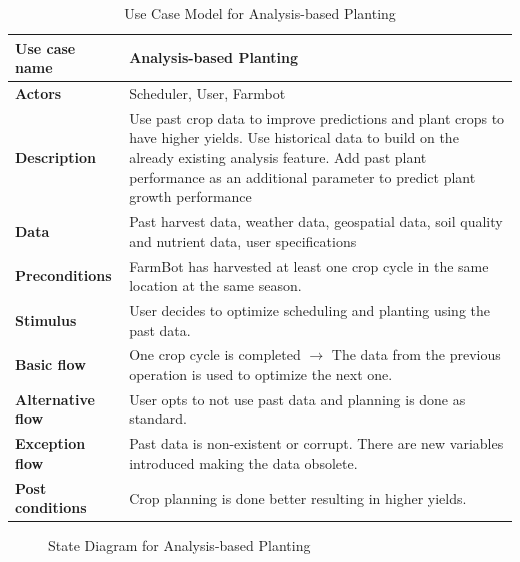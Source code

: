\begin{table}[H]
\centering
\footnotesize
\begin{tabular}{|p{3.5cm}|p{8.5cm}|}
\hline
\textbf{Use case name}    & Analysis-based Planting \\
\hline
\textbf{Actors}           & Scheduler, User, Farmbot \\
\hline
\textbf{Description}      & Use past crop data to improve predictions and plant crops to have higher yields. Use historical data to build on the already existing analysis feature. Add past plant performance as an additional parameter to predict plant growth performance\\
\hline
\textbf{Data}             & Past harvest data, weather data, geospatial data, soil quality and nutrient data, user specifications \\
\hline
\textbf{Preconditions}    & FarmBot has harvested at least one crop cycle in the same location at the same season. \\
\hline
\textbf{Stimulus}         & User decides to optimize scheduling and planting using the past data. \\
\hline
\textbf{Basic flow}       & One crop cycle is completed $\rightarrow$ The data from the previous operation is used to optimize the next one. \\
\hline
\textbf{Alternative flow} & User opts to not use past data and planning is done as standard. \\
\hline
\textbf{Exception flow}   & Past data is non-existent or corrupt. There are new variables introduced making the data obsolete. \\
\hline
\textbf{Post conditions}  & Crop planning is done better resulting in higher yields. \\
\hline
\end{tabular}
\caption{Use Case Model for Analysis-based Planting}
\end{table}

\begin{figure}[H]
    \centering

\caption{State Diagram for Analysis-based Planting}
\end{figure}

